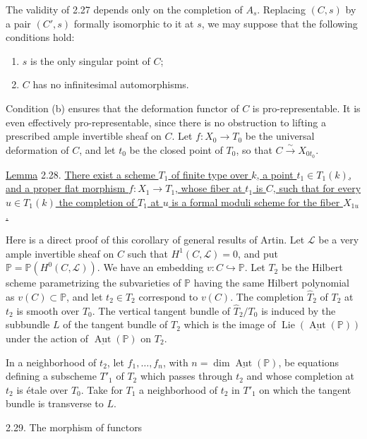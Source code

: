 The validity of 2.27 depends only on the completion of $A_s$.  Replacing
$(C,s)$ by a pair $(C',s)$ formally isomorphic to it at $s$, we may suppose
that the following conditions hold:

\begin{enumerate}[label=(\alph*),leftmargin=1.2cm]
\item $s$ is the only singular point of $C$;
\item $C$ has no infinitesimal automorphisms.
\end{enumerate}

Condition (b) ensures that the deformation functor of $C$ is pro-representable.
It is even effectively pro-representable, since there is no obstruction to
lifting a prescribed ample invertible sheaf on $C$.  Let
$f:X_0\longrightarrow T_0$ be the universal deformation of $C$, and let $t_0$
be the closed point of $T_0$, so that $C\overset\sim\longrightarrow X_{0t_0}$.

\underline{Lemma} 2.28. \underline{There exist a scheme $T_1$ of finite type
over $k$, a point $t_1\in T_1(k)$, and a proper flat morphism
$f:X_1\longrightarrow T_1$, whose fiber at $t_1$ is $C$, such that for every
$u\in T_1(k)$ the completion of $T_1$ at $u$ is a formal moduli scheme for the
fiber $X_{1u}$.}

Here is a direct proof of this corollary of general results of Artin.  Let
$\mathcal L$ be a very ample invertible sheaf on $C$ such that
$H^1(C,\mathcal L)=0$, and put
$\mathbb P=\mathbb P(H^0(C,\mathcal L))$.  We have an embedding
$v:C\hookrightarrow\mathbb P$.  Let $T_2$ be the Hilbert scheme parametrizing
the subvarieties of $\mathbb P$ having the same Hilbert polynomial as
$v(C)\subset\mathbb P$, and let $t_2\in T_2$ correspond to $v(C)$.  The
completion $\widehat T_2$ of $T_2$ at $t_2$ is smooth over $T_0$.  The vertical
tangent bundle of $\widehat T_2/T_0$ is induced by the subbundle $L$ of the
tangent bundle of $T_2$ which is the image of
$\operatorname{Lie}(\underline{\operatorname{Aut}}(\mathbb P))$ under the
action of $\underline{\operatorname{Aut}}(\mathbb P)$ on $T_2$.

In a neighborhood of $t_2$, let $f_1,\ldots,f_n$, with
$n=\dim\underline{\operatorname{Aut}}(\mathbb P)$, be equations defining a
subscheme $T'_1$ of $T_2$ which passes through $t_2$ and whose completion at
$t_2$ is étale over $T_0$.  Take for $T_1$ a neighborhood of $t_2$ in $T'_1$
on which the tangent bundle is transverse to $L$.


2.29. The morphism of functors

